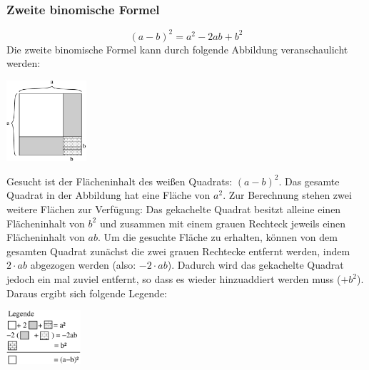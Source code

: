 \subsubsection{Zweite binomische Formel}
	\[(a - b)^2 = a^2 - 2ab + b^2\]
Die zweite binomische Formel kann durch folgende Abbildung veranschaulicht werden:
\begin{center}
\includegraphics[height=3cm]{img/binF2.pdf}
\end{center}
Gesucht ist der Flächeninhalt des wei\ss en Quadrats: $(a-b)^2$. Das gesamte Quadrat in der Abbildung hat eine Fläche von $ a^2 $. Zur Berechnung stehen zwei weitere Flächen zur Verfügung: Das gekachelte Quadrat besitzt alleine einen Flächeninhalt von $b^2$ und zusammen mit einem grauen Rechteck jeweils einen Flächeninhalt von $ ab $. Um die gesuchte Fläche zu erhalten, können von dem gesamten Quadrat zunächst die zwei grauen Rechtecke entfernt werden, indem $ 2\cdot ab $ abgezogen werden (also: $ -2\cdot ab $). Dadurch wird das gekachelte Quadrat jedoch ein mal zuviel entfernt, so dass es wieder hinzuaddiert werden muss ($+b^2$). Daraus ergibt sich folgende Legende:
\begin{center}
\includegraphics[height=2cm]{img/binF2legende.pdf}
\end{center}
